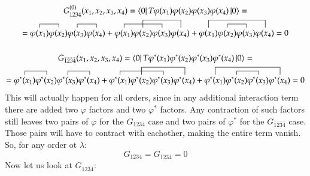 \documentclass{article}
\begin{document}
\begin{equation}
\begin{gathered}
    G_{1234}^{(0)}(x_1, x_2, x_3, x_4) = \bra{0}T \varphi(x_1) \varphi(x_2) \varphi(x_3) \varphi(x_4) \ket{0} = \\ =
    \contraction{}{\varphi(x_1)}{}{\varphi(x_2)}
    \contraction{\varphi(x_1)\varphi(x_2)}{\varphi(x_3)}{}{\varphi(x_4)}
    \varphi(x_1) \varphi(x_2)\varphi(x_3) \varphi(x_4) +
    \contraction{}{\varphi(x_1)}{\varphi(x_2)}{\varphi(x_3)}
    \contraction[2ex]{\varphi(x_1)}{\varphi(x_2)}{\varphi(x_3)}{\varphi(x_4)}
    \varphi(x_1) \varphi(x_2)\varphi(x_3) \varphi(x_4) +
    \contraction[2ex]{}{\varphi(x_1)}{\varphi(x_2)\varphi(x_3)}{\varphi(x_4)}
    \contraction{\varphi(x_1)}{\varphi(x_2)}{}{\varphi(x_3)}
    \varphi(x_1) \varphi(x_2)\varphi(x_3) \varphi(x_4) = 0
    \\ \\
    G_{\bar{1}\bar{2}\bar{3}\bar{4}}(x_1, x_2, x_3, x_4) = \bra{0}T \varphi^*(x_1) \varphi^*(x_2) \varphi^*(x_3) \varphi^*(x_4) \ket{0} = \\ =
    \contraction{}{\varphi^*(x_1)}{}{\varphi^*(x_2)}
    \contraction{\varphi^*(x_1)\varphi^*(x_2)}{\varphi^*(x_3)}{}{\varphi^*(x_4)}
    \varphi^*(x_1) \varphi^*(x_2)\varphi^*(x_3) \varphi^*(x_4) +
    \contraction{}{\varphi^*(x_1)}{\varphi^*(x_2)}{\varphi^*(x_3)}
    \contraction[2ex]{\varphi^*(x_1)}{\varphi^*(x_2)}{\varphi^*(x_3)}{\varphi^*(x_4)}
    \varphi^*(x_1) \varphi^*(x_2)\varphi^*(x_3) \varphi^*(x_4) +
    \contraction[2ex]{}{\varphi^*(x_1)}{\varphi^*(x_2)\varphi^*(x_3)}{\varphi^*(x_4)}
    \contraction{\varphi^*(x_1)}{\varphi^*(x_2)}{}{\varphi^*(x_3)}
    \varphi^*(x_1) \varphi^*(x_2)\varphi^*(x_3) \varphi^*(x_4) = 0
\end{gathered}
\end{equation}
This will actually happen for all orders, since in any additional interaction term there are added two $\varphi$ factors and two $\varphi^*$ factors. Any contraction of such factors still leaves two pairs of $\varphi$ for the $G_{1234}$ case and two pairs of $\varphi^*$ for the $G_{\bar{1}\bar{2}\bar{3}\bar{4}}$ case. Those pairs will have to contract with eachother, making the entire term vanish. So, for any order ot $\lambda$:
\begin{equation}
    G_{1234} = G_{\bar{1}\bar{2}\bar{3}\bar{4}} = 0
\end{equation}
Now let us look at $G_{12\bar{3}\bar{4}}$:
\end{document}
